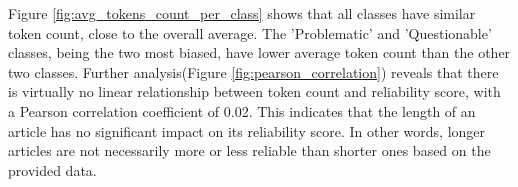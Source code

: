 Figure \ref{fig:avg_tokens_count_per_class} shows that all classes have similar token count, close to the overall average. The 'Problematic' and 'Questionable' classes, being the two most biased, have lower average token count than the other two classes. Further analysis(Figure \ref{fig:pearson_correlation}) reveals that there is virtually no linear relationship between token count and reliability score, with a Pearson correlation coefficient of 0.02. This indicates that the length of an article has no significant impact on its reliability score. In other words, longer articles are not necessarily more or less reliable than shorter ones based on the provided data.

